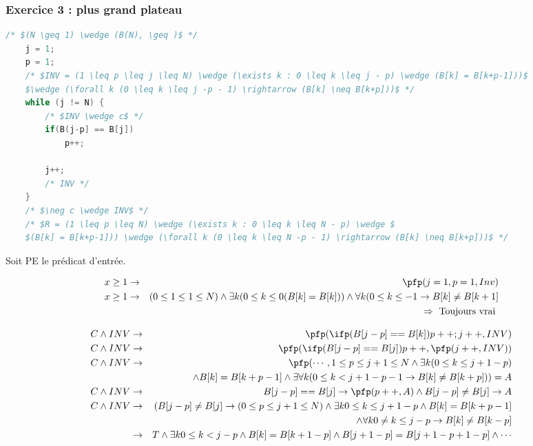 \subsubsection{Exercice 3 : plus grand plateau}
\begin{lstlisting}[language=C]
	/* $(N \geq 1) \wedge (B(N), \geq )$ */
	j = 1;
	p = 1;
	/* $INV = (1 \leq p \leq j \leq N) \wedge (\exists k : 0 \leq k \leq j - p) \wedge (B[k] = B[k+p-1]))$
	$\wedge (\forall k (0 \leq k \leq j -p - 1) \rightarrow (B[k] \neq B[k+p]))$ */
	while (j != N) {
		/* $INV \wedge c$ */
		if(B(j-p] == B[j]) 
			p++;

		j++;
		/* INV */
	}
	/* $\neg c \wedge INV$ */
	/* $R = (1 \leq p \leq N) \wedge (\exists k : 0 \leq k \leq N - p) \wedge $
	$(B[k] = B[k+p-1])) \wedge (\forall k (0 \leq k \leq N -p - 1) \rightarrow (B[k] \neq B[k+p]))$ */
\end{lstlisting}

Soit PE le prédicat d'entrée.


\begin{eqnarray*}
	x \geq 1 &\rightarrow& \pfp (j=1,p=1, Inv)\\
	x \geq 1 &\rightarrow& (0 \leq 1 \leq 1 \leq N)\wedge \exists k(0 \leq k \leq 0 (B[k]=B[k])) \wedge \forall k(0 \leq k \leq -1 \rightarrow B[k] \neq B[k+1]\\
	&& \Rightarrow \textrm{ Toujours vrai }
\end{eqnarray*}

\begin{eqnarray*}
	C \wedge INV &\rightarrow& \pfp (\ifp (B[j-p] == B[k]) p++;j++,INV)\\
	C \wedge INV &\rightarrow& \pfp (\ifp(B[j-p] == B[j]) p++, \pfp(j++, INV))\\
	C \wedge INV &\rightarrow& \pfp(\cdots
	, 1 \leq p \leq j+1 \leq N \wedge \exists k (0 \leq k\leq j + 1 - p)\\&&
			\wedge B[k] = B[k+p-1] \wedge \exists \forall k(0 \leq k < j+1-p-1 \rightarrow B[k] \neq B[k+p] )) = A\\
C \wedge INV &\rightarrow& B[j-p] == B[j] \rightarrow \pfp (p++, A) \wedge B[j-p]  \neq B[j] \rightarrow A\\
C \wedge INV &\rightarrow& (B[j-p] \neq B[j] \rightarrow (0 \leq p \leq j+1 \leq N) \wedge \exists k 0 \leq k \leq j+1-p \wedge B[k] = B[k+p-1] \\&&
\wedge \forall k 0 \neq k \leq j-p \rightarrow B[k] \neq B[k-p]\\
&\rightarrow& T \wedge \exists k 0 \leq k< j-p \wedge B[k] = B[k+1-p] \wedge B[j+1-p] = B[j+1-p+1-p] \wedge \cdots\\
\end{eqnarray*}

